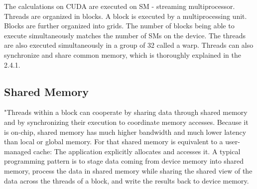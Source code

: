 \documentclass[oneside,openright,12pt,final,en]{mgr}
\begin{document}
The calculations on CUDA are executed on SM - streaming multiprocessor. Threads are organized in blocks. A block is executed by a multiprocessing unit. Blocks are further organized into grids. The number of blocks being able to execute simultaneously matches the number of SMs on the device.
The threads are also executed simultaneously in a group of 32 called a warp. Threads can also synchronize and share common memory, which is thoroughly explained in the 2.4.1. 


\subsection{Shared Memory}
"Threads within a block can cooperate by sharing data through shared memory and by synchronizing their execution to coordinate memory accesses. Because it is on-chip, shared memory has much higher bandwidth and much lower latency than local or global memory. For that shared memory is equivalent to a user-managed cache: The application explicitly allocates and accesses it. A typical programming pattern is to stage data coming from device memory into shared memory, process the data in shared memory while sharing the shared view of the data across the threads of a block, and write the results back to device memory.
\end{document}
